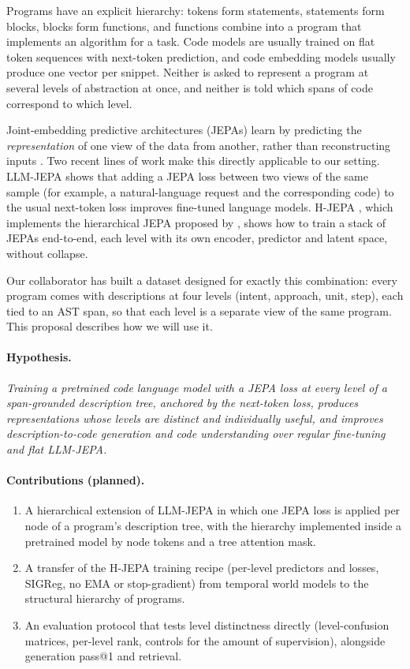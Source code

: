 \documentclass[11pt]{article}
\begin{document}
Programs have an explicit hierarchy: tokens form statements, statements form blocks, blocks form functions, and
functions combine into a program that implements an algorithm for a task. Code models are usually trained on flat
token sequences with next-token prediction, and code embedding models usually produce one vector per snippet. Neither
is asked to represent a program at several levels of abstraction at once, and neither is told which spans of code
correspond to which level.

Joint-embedding predictive architectures (JEPAs) learn by predicting the \emph{representation} of one view of the data
from another, rather than reconstructing inputs \citep{lecun2022path,assran2023ijepa}. Two recent lines of work make
this directly applicable to our setting. LLM-JEPA \citep{huang2025llmjepa} shows that adding a JEPA loss between two
views of the same sample (for example, a natural-language request and the corresponding code) to the usual
next-token loss improves fine-tuned language models. H-JEPA \citep{zhang2026hjepa}, which implements the
hierarchical JEPA proposed by \citet{lecun2022path}, shows how to train a stack of JEPAs end-to-end, each level with
its own encoder, predictor and latent space, without collapse.

Our collaborator has built a dataset designed for exactly this combination: every program comes with descriptions at
four levels (intent, approach, unit, step), each tied to an AST span, so that each level is a separate view of the
same program. This proposal describes how we will use it.

\paragraph{Hypothesis.}
\emph{Training a pretrained code language model with a JEPA loss at every level of a span-grounded description tree,
anchored by the next-token loss, produces representations whose levels are distinct and individually useful, and
improves description-to-code generation and code understanding over regular fine-tuning and flat LLM-JEPA.}

\paragraph{Contributions (planned).}
\begin{enumerate}
  \item A hierarchical extension of LLM-JEPA in which one JEPA loss is applied per node of a program's description
        tree, with the hierarchy implemented inside a pretrained model by node tokens and a tree attention mask.
  \item A transfer of the H-JEPA training recipe (per-level predictors and losses, SIGReg, no EMA or
        stop-gradient) from temporal world models to the structural hierarchy of programs.
  \item An evaluation protocol that tests level distinctness directly (level-confusion matrices, per-level rank,
        controls for the amount of supervision), alongside generation pass@1 and retrieval.
\end{enumerate}
\end{document}
